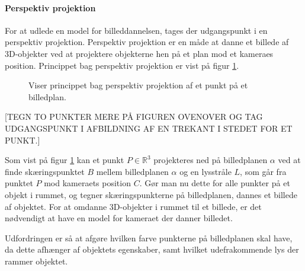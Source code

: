 \paragraph{Perspektiv projektion}
For at udlede en model for billeddannelsen, tages der udgangspunkt i en perspektiv projektion. Perspektiv projektion er en måde at danne et billede af 3D-objekter ved at projektere objekterne hen på et plan mod et kameraes position\cite{fig:perspective_projection}. Princippet bag perspektiv projektion er vist på figur \ref{fig:perspektiv_projektion}.

\begin{figure}[H]
  \label{fig:perspektiv_projektion}
  \centering
  \caption{Viser princippet bag perspektiv projektion af et punkt på et billedplan.}
\end{figure}

[TEGN TO PUNKTER MERE PÅ FIGUREN OVENOVER OG TAG UDGANGSPUNKT I AFBILDNING AF EN TREKANT I STEDET FOR ET PUNKT.]

Som vist på figur \ref{fig:perspektiv_projektion} kan et punkt $P\in \mathbb{R}^3$ projekteres ned på billedplanen $\alpha$ ved at finde skæringspunktet $B$ mellem billedplanen $\alpha$ og en lysstråle $L$, som går fra punktet $P$ mod kameraets position $C$. Gør man nu dette for alle punkter på et objekt i rummet, og tegner skæringspunkterne på billedplanen, dannes et billede af objektet. For at omdanne 3D-objekter i rummet til et billede, er det nødvendigt at have en model for kameraet der danner billedet. 

Udfordringen er så at afgøre hvilken farve punkterne på billedplanen skal have, da dette afhænger af objektets egenskaber, samt hvilket udefrakommende lys der rammer objektet. 

